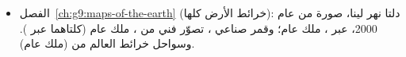 \begin{itemize}
  \item الفصل~\ref{ch:g9:maps-of-the-earth} (خرائط الأرض كلها): دلتا نهر لينا، صورة  من عام 2000،  عبر ، ملك عام؛ وقمر صناعي ، تصوّر فني من ، ملك عام (كلتاهما عبر ). وسواحل خرائط العالم من  (ملك عام).
\end{itemize}
